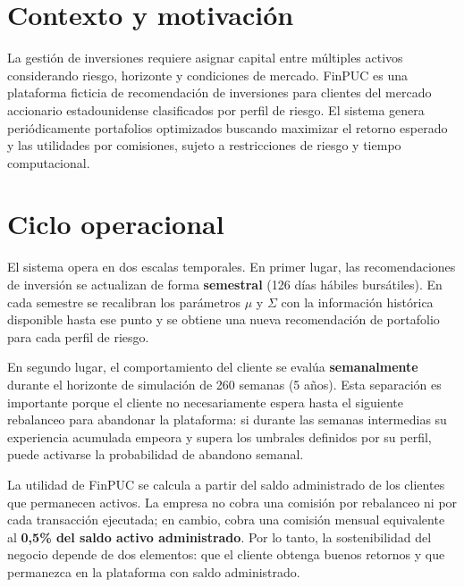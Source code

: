 \section{Contexto y motivación}

La gesti\'on de inversiones requiere asignar capital entre m\'ultiples activos considerando riesgo, horizonte y condiciones de mercado. FinPUC es una plataforma ficticia de recomendaci\'on de inversiones para clientes del mercado accionario estadounidense clasificados por perfil de riesgo. El sistema genera peri\'odicamente portafolios optimizados buscando maximizar el retorno esperado y las utilidades por comisiones, sujeto a restricciones de riesgo y tiempo computacional.

\section{Ciclo operacional}

El sistema opera en dos escalas temporales. En primer lugar, las
recomendaciones de inversi\'on se actualizan de forma \textbf{semestral}
(126 d\'ias h\'abiles burs\'atiles). En cada semestre se recalibran los
par\'ametros $\mu$ y $\Sigma$ con la informaci\'on hist\'orica disponible hasta
ese punto y se obtiene una nueva recomendaci\'on de portafolio para cada perfil
de riesgo.

En segundo lugar, el comportamiento del cliente se eval\'ua \textbf{semanalmente}
durante el horizonte de simulaci\'on de 260 semanas (5 a\~nos). Esta separaci\'on
es importante porque el cliente no necesariamente espera hasta el siguiente
rebalanceo para abandonar la plataforma: si durante las semanas intermedias su
experiencia acumulada empeora y supera los umbrales definidos por su perfil,
puede activarse la probabilidad de abandono semanal.

La utilidad de FinPUC se calcula a partir del saldo administrado de los clientes
que permanecen activos. La empresa no cobra una comisi\'on por rebalanceo ni por
cada transacci\'on ejecutada; en cambio, cobra una comisi\'on mensual equivalente
al \textbf{0,5\% del saldo activo administrado}. Por lo tanto, la sostenibilidad
del negocio depende de dos elementos: que el cliente obtenga buenos retornos y
que permanezca en la plataforma con saldo administrado.

